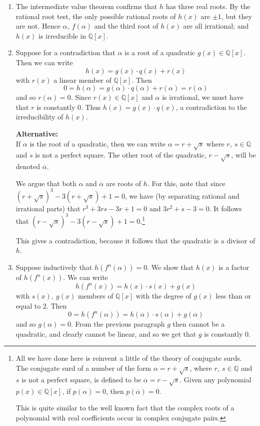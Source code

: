 \documentclass[12pt]{article}
\begin{document}
\begin{enumerate}
\begin{enumerate}[label=(\alph*)]

\item The intermediate value theorem confirms that $h$ has three real 
roots. By the rational root test, the only possible rational roots 
of $h(x)$ are $\pm 1$, but they are not. Hence $\alpha, \ f(\alpha)$ and 
the third root of $h(x)$ are all irrational; and $h(x)$ is irreducible 
in $\mathbb{Q} [x]$.

\item Suppose for a contradiction that $\alpha$ is a root of a quadratic 
$g(x) \in \mathbb{Q} [x]$. Then we can write
$$
h(x) = g(x) \cdot q(x) + r(x)
$$
with $r(x)$ a linear member of $\mathbb{Q} [x]$. Then 
$$
0 = h(\alpha) = g(\alpha) \cdot q(\alpha) + r(\alpha) = r(\alpha)
$$
and so $r(\alpha) = 0$. Since $r(x) \in \mathbb{Q} [x]$ and $\alpha$ is irrational, 
we must have that $r$ is constantly 0. Thus $h(x) = g(x) \cdot q(x)$, 
a contradiction to the irreducibility of $h(x)$.

{\bf{Alternative:}}\\
If $\alpha$ is the root of a quadratic, then we can write
$\alpha = r + \sqrt{s}$ where $r, \ s \in \mathbb{Q}$ and $s$ is not a
perfect square. The other root of the quadratic, $r - \sqrt{s}$,
will be denoted $\overline{\alpha}$.

We argue that both $\alpha$ and $\overline{\alpha}$ are roots of $h$.
For this, note that since $(r + \sqrt{s})^3 - 3(r + \sqrt{s}) +1 = 0$,
we have (by separating rational and irrational parts) that
$r^3 + 3rs - 3r +1 = 0$ and $3r^2 + s - 3 = 0$. It follows that
$(r - \sqrt{s})^3 - 3(r - \sqrt{s}) +1 = 0$.\footnote{
All we have done here is reinvent a little of the theory of conjugate
surds. The conjugate surd of a number of the form $ \alpha = r + \sqrt{s}$,
where $r, \ s \in \mathbb{Q}$ and $s$ is not a perfect square, is
defined to be $\overline{\alpha} = r - \sqrt{s}$. Given any polynomial
$p(x) \in \mathbb{Q}[x]$, if $p(\alpha) = 0$, then $p(\overline{\alpha}) = 0$.

This is quite similar to the well known fact that the complex roots of
a polynomial with real coefficients occur in complex conjugate pairs.}

This gives a contradiction, because it follows that the quadratic
is a divisor of $h$. 

\item Suppose inductively that $h(f^n(\alpha)) = 0$. We show that $h(x)$ is a 
factor of $h(f^n(x))$. We can write
$$
h(f^n(x)) = h(x) \cdot s(x) + g(x)
$$
with $s(x), \ g(x)$ members of $\mathbb{Q} [x]$ with the degree of $g(x)$ less 
than or equal to 2. Then 
$$
0 = h(f^n(\alpha)) = h(\alpha) \cdot s(\alpha) + g(\alpha)
$$
and so $g(\alpha) = 0$. From the previous paragraph $g$ then cannot be 
a quadratic, and clearly cannot be linear, and so we get that $g$ is 
constantly 0.


\end{enumerate}
\end{enumerate}
\end{document}
